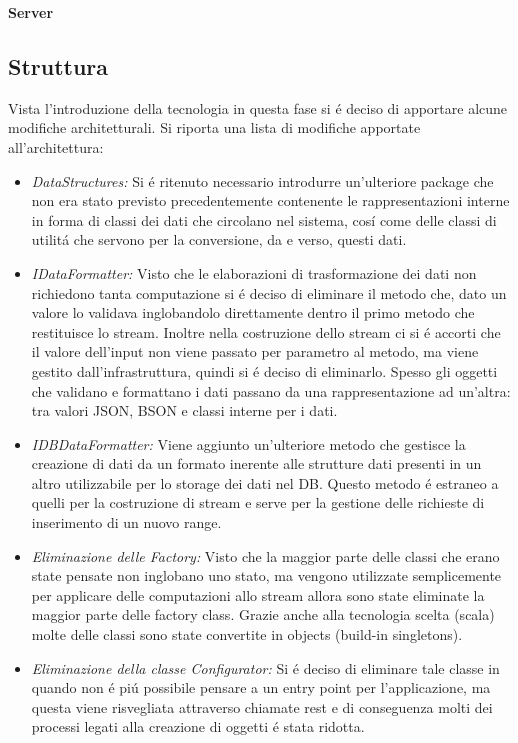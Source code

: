 \begin{center}
  \textbf{Server}
\end{center}

\subsection{Struttura}

Vista l'introduzione della tecnologia in questa fase si \'e deciso di apportare alcune modifiche architetturali. Si riporta una lista di modifiche apportate all'architettura:

\begin{itemize}
  \item \textit{DataStructures:} Si \'e ritenuto necessario introdurre un'ulteriore package che non era stato previsto precedentemente contenente le rappresentazioni interne in forma di classi dei dati che circolano nel sistema, cos\'i come delle classi di utilit\'a che servono per la conversione, da e verso, questi dati.
  \item \textit{IDataFormatter:} Visto che le elaborazioni di trasformazione dei dati non richiedono tanta computazione si \'e deciso di eliminare il metodo che, dato un valore lo validava inglobandolo direttamente dentro il primo metodo che restituisce lo stream. Inoltre nella costruzione dello stream ci si \'e accorti che il valore dell'input non viene passato per parametro al metodo, ma viene gestito dall'infrastruttura, quindi si \'e deciso di eliminarlo. Spesso gli oggetti che validano e formattano i dati passano da una rappresentazione ad un'altra: tra valori JSON, BSON e classi interne per i dati.
  \item \textit{IDBDataFormatter:} Viene aggiunto un'ulteriore metodo che gestisce la creazione di dati da un formato inerente alle strutture dati presenti in un altro utilizzabile per lo storage dei dati nel DB. Questo metodo \'e estraneo a quelli per la costruzione di stream e serve per la gestione delle richieste di inserimento di un nuovo range.
  \item \textit{Eliminazione delle Factory:} Visto che la maggior parte delle classi che erano state pensate non inglobano uno stato, ma vengono utilizzate semplicemente per applicare delle computazioni allo stream allora sono state eliminate la maggior parte delle factory class. Grazie anche alla tecnologia scelta (scala) molte delle classi sono state convertite in objects (build-in singletons).
  \item \textit{Eliminazione della classe Configurator:} Si \'e deciso di eliminare tale classe in quando non \'e pi\'u possibile pensare a un entry point per l'applicazione, ma questa viene risvegliata attraverso chiamate rest e di conseguenza molti dei processi legati alla creazione di oggetti \'e stata ridotta.
\end{itemize}

